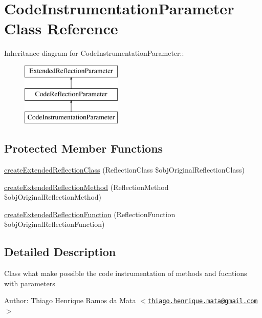 \hypertarget{class_code_instrumentation_parameter}{
\section{CodeInstrumentationParameter Class Reference}
\label{class_code_instrumentation_parameter}
}
Inheritance diagram for CodeInstrumentationParameter::\begin{figure}[H]
\begin{center}
\leavevmode
\includegraphics[height=3cm]{class_code_instrumentation_parameter}
\end{center}
\end{figure}
\subsection*{Protected Member Functions}
\begin{CompactItemize}
\item 
\hyperlink{class_code_instrumentation_parameter_6b56ec198bc6a5b5a72076e4e7c19e29}{createExtendedReflectionClass} (ReflectionClass \$objOriginalReflectionClass)
\item 
\hyperlink{class_code_instrumentation_parameter_ec7c1d4b204b6e3a6291d3b867afb688}{createExtendedReflectionMethod} (ReflectionMethod \$objOriginalReflectionMethod)
\item 
\hyperlink{class_code_instrumentation_parameter_b23ad87d3ac2f376c1a133ca6d27f031}{createExtendedReflectionFunction} (ReflectionFunction \$objOriginalReflectionFunction)
\end{CompactItemize}


\subsection{Detailed Description}
Class what make possible the code instrumentation of methods and fucntions with parameters

\begin{Desc}
\item[Author:]Thiago Henrique Ramos da Mata $<$\href{mailto:thiago.henrique.mata@gmail.com}{\tt thiago.henrique.mata@gmail.com}$>$ \end{Desc}


